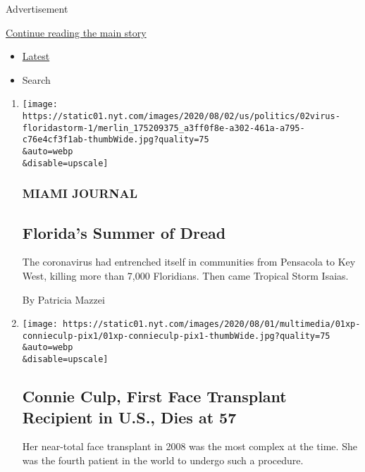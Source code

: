 Advertisement

\protect\hyperlink{after-mid1}{Continue reading the main story}

\begin{itemize}
\tightlist
\item
  \protect\hyperlink{stream-panel}{Latest}
\item
  Search
\end{itemize}

\begin{enumerate}
\def\labelenumi{\arabic{enumi}.}
\item
  \href{/2020/08/02/us/florida-hurricane-isaias-coronavirus.html}{}

  \texttt{[image: https://static01.nyt.com/images/2020/08/02/us/politics/02virus-floridastorm-1/merlin\_175209375\_a3ff0f8e-a302-461a-a795-c76e4cf3f1ab-thumbWide.jpg?quality=75\\\&auto=webp\\\&disable=upscale]}

  \hypertarget{miami-journal}{%
  \subsubsection{MIAMI JOURNAL}\label{miami-journal}}

  \hypertarget{floridas-summer-of-dread}{%
  \subsection{Florida's Summer of
  Dread}\label{floridas-summer-of-dread}}

  The coronavirus had entrenched itself in communities from Pensacola to
  Key West, killing more than 7,000 Floridians. Then came Tropical Storm
  Isaias.

  By Patricia Mazzei
\item
  \href{/2020/08/01/us/Connie-culp-dead-face-transplant.html}{}

  \texttt{[image: https://static01.nyt.com/images/2020/08/01/multimedia/01xp-connieculp-pix1/01xp-connieculp-pix1-thumbWide.jpg?quality=75\\\&auto=webp\\\&disable=upscale]}

  \hypertarget{connie-culp-first-face-transplant-recipient-in-us-dies-at-57}{%
  \subsection{Connie Culp, First Face Transplant Recipient in U.S., Dies
  at
  57}\label{connie-culp-first-face-transplant-recipient-in-us-dies-at-57}}

  Her near-total face transplant in 2008 was the most complex at the
  time. She was the fourth patient in the world to undergo such a
  procedure.


\end{enumerate}
